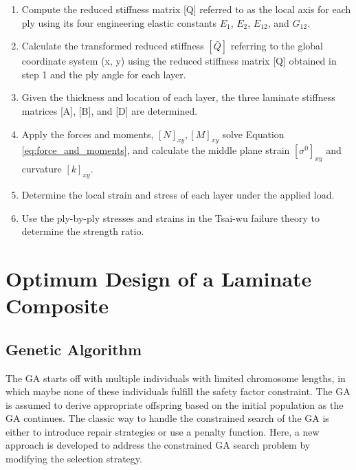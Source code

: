 \documentclass[USenglish,twocolumn]{article}
\begin{document}
\begin{enumerate}
\item Compute the reduced stiffness matrix [Q] referred to as the local axis for each ply using its four engineering elastic constants $E_1 $, $E_2 $, $E_{12} $, and $G_{12} $.

\item Calculate the transformed reduced stiffness $[\bar{Q}] $ referring to the global coordinate system (x, y) using the reduced stiffness matrix [Q] obtained in step 1 and the ply angle for each layer.

\item  Given the thickness and location of each layer, the three laminate stiffness matrices [A], [B], and [D] are determined.

\item  Apply the forces and moments, $[N]_{xy}, [M]_{xy} $ solve
Equation \ref{eq:force_and_moments}, and calculate the middle plane strain $[\sigma ^{0}]_{xy} $ and curvature $[k]_{xy} $.

\item Determine the local strain and stress of each layer under the applied load.

\item  Use the ply-by-ply stresses and strains in the Tsai-wu failure theory to determine the strength ratio.
\end{enumerate}

\section{Optimum Design of a Laminate Composite}

\subsection{Genetic Algorithm}
The GA starts off with multiple individuals with limited chromosome lengths, in which maybe none of
these individuals fulfill the safety factor constraint. The GA is assumed to derive appropriate
offspring based on the initial population as the GA continues. The classic way to handle the constrained
search of the GA is either to introduce repair strategies or use a penalty function. Here, a new
approach is developed to address the constrained GA search problem by modifying the selection
strategy.
\end{document}
